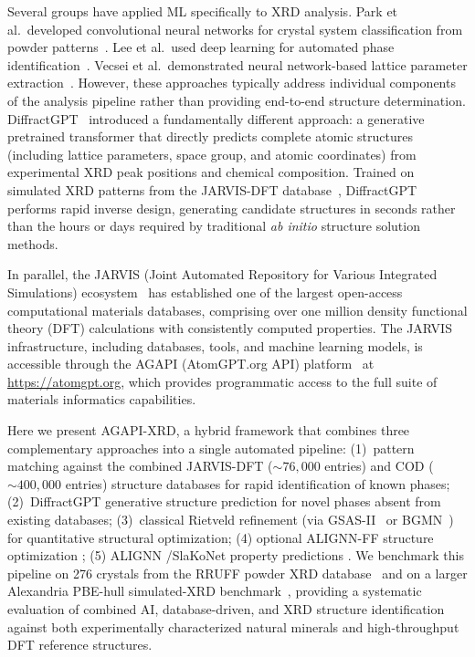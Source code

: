 \documentclass[pdflatex,sn-mathphys-num]{sn-jnl}
\theoremstyle{thmstyleone}
\theoremstyle{thmstyletwo}
\theoremstyle{thmstylethree}
\begin{document}
Several groups have applied ML specifically to XRD analysis. Park et al.\ developed convolutional neural networks for crystal system classification from powder patterns~\cite{park2017}. Lee et al.\ used deep learning for automated phase identification~\cite{lee2020xrd}. Vecsei et al.\ demonstrated neural network-based lattice parameter extraction~\cite{vecsei2019}. However, these approaches typically address individual components of the analysis pipeline rather than providing end-to-end structure determination. DiffractGPT~\cite{diffractgpt2025} introduced a fundamentally different approach: a generative pretrained transformer that directly predicts complete atomic structures (including lattice parameters, space group, and atomic coordinates) from experimental XRD peak positions and chemical composition. Trained on simulated XRD patterns from the JARVIS-DFT database~\cite{jarvis2020}, DiffractGPT performs rapid inverse design, generating candidate structures in seconds rather than the hours or days required by traditional \textit{ab initio} structure solution methods.

In parallel, the JARVIS (Joint Automated Repository for Various Integrated Simulations) ecosystem~\cite{jarvis2020,choudhary2025jarvis} has established one of the largest open-access computational materials databases, comprising over one million density functional theory (DFT) calculations with consistently computed properties. The JARVIS infrastructure, including databases, tools, and machine learning models, is accessible through the AGAPI (AtomGPT.org API) platform~\cite{agapi2025} at \url{https://atomgpt.org}, which provides programmatic access to the full suite of materials informatics capabilities.

Here we present AGAPI-XRD, a hybrid framework that combines three complementary approaches into a single automated pipeline: (1)~pattern matching against the combined JARVIS-DFT (${\sim}76{,}000$ entries) and COD (${\sim}400{,}000$ entries) structure databases for rapid identification of known phases; (2)~DiffractGPT generative structure prediction for novel phases absent from existing databases; (3)~classical Rietveld refinement (via GSAS-II~\cite{toby2013} or BGMN~\cite{bgmn1998}) for quantitative structural optimization; (4) optional ALIGNN-FF structure optimization \cite{choudhary2023unified}; (5) ALIGNN \cite{alignn2021}/SlaKoNet property predictions \cite{slakonet2024}. We benchmark this pipeline on 276 crystals from the RRUFF powder XRD database~\cite{rruff2015} and on a larger Alexandria PBE-hull simulated-XRD benchmark~\cite{alexandria}, providing a systematic evaluation of combined AI, database-driven, and XRD structure identification against both experimentally characterized natural minerals and high-throughput DFT reference structures.
\end{document}
